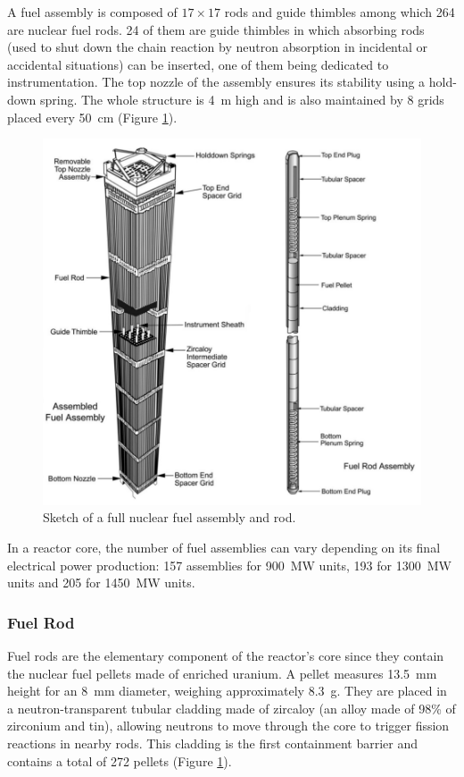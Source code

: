 A fuel assembly is composed of $17 \times 17$ rods and guide thimbles among which 264 are nuclear fuel rods. 24 of them are guide thimbles in which absorbing rods (used to shut down the chain reaction by neutron absorption in incidental or accidental situations) can be inserted, one of them being dedicated to instrumentation. The top nozzle of the assembly ensures its stability using a hold-down spring. The whole structure is 4\ m high and is also maintained by 8 grids placed every 50\ cm (Figure \ref{fig:fuel_assembly}). 



\begin{figure}[!h]
\centering
\includegraphics[width=0.7\linewidth]{img/intro/fuel_assembly.png}
\caption{Sketch of a full nuclear fuel assembly and rod. \cite{croff_introduction_2008}}
\label{fig:fuel_assembly}
\end{figure}

\npar

In a reactor core, the number of fuel assemblies can vary depending on its final electrical power production: 157 assemblies for 900\ MW units, 193 for 1300~MW units and 205 for 1450~MW units.

\subsubsection{Fuel Rod}

Fuel rods are the elementary component of the reactor's core since they contain the nuclear fuel pellets made of enriched uranium. A pellet measures 13.5\ mm height for an 8\ mm diameter, weighing approximately 8.3\ g. They are placed in a neutron-transparent tubular cladding made of zircaloy (an alloy made of 98\% of zirconium and tin), allowing neutrons to move through the core to trigger fission reactions in nearby rods. This cladding is the first containment barrier and contains a total of 272 pellets (Figure \ref{fig:fuel_assembly}).


